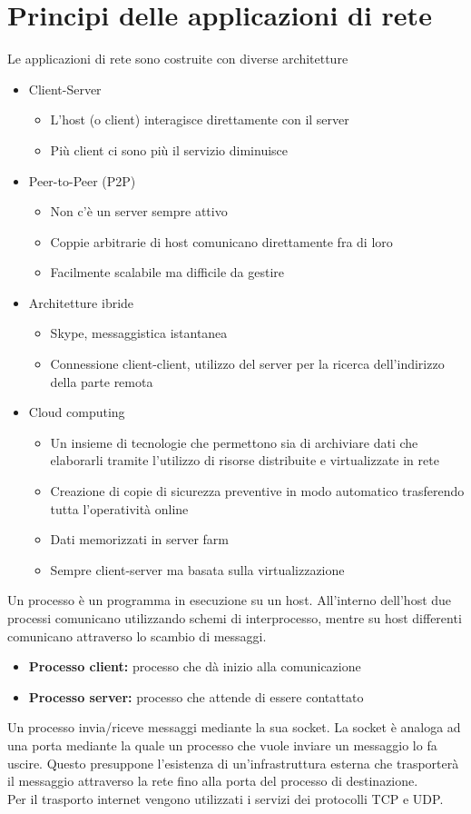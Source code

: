 \documentclass{report}
\begin{document}
	\section{Principi delle applicazioni di rete}
	Le applicazioni di rete sono costruite con diverse architetture
	\begin{itemize}
		\item Client-Server
		\begin{itemize}
			\item L'host (o client) interagisce direttamente con il server
			\item Più client ci sono più il servizio diminuisce
		\end{itemize}
		\item Peer-to-Peer (P2P)
		\begin{itemize}
			\item Non c'è un server sempre attivo
			\item Coppie arbitrarie di host comunicano direttamente fra di loro
			\item Facilmente scalabile ma difficile da gestire
		\end{itemize}
		\item Architetture ibride
		\begin{itemize}
			\item Skype, messaggistica istantanea
			\item Connessione client-client, utilizzo del server per la ricerca dell'indirizzo della parte remota
		\end{itemize}
		\item Cloud computing
		\begin{itemize}
			\item Un insieme di tecnologie che permettono sia di archiviare dati che elaborarli tramite l'utilizzo di risorse distribuite e virtualizzate in rete
			\item Creazione di copie di sicurezza preventive in modo automatico trasferendo tutta l'operatività online
			\item Dati memorizzati in server farm
			\item Sempre client-server ma basata sulla virtualizzazione
		\end{itemize}
	\end{itemize}
	Un processo è un programma in esecuzione su un host. All'interno dell'host due processi comunicano utilizzando schemi di interprocesso, mentre su host differenti comunicano attraverso lo scambio di messaggi.
	\begin{itemize}
		\item \textbf{Processo client:} processo che dà inizio alla comunicazione
		\item \textbf{Processo server:} processo che attende di essere contattato
	\end{itemize}
	Un processo invia/riceve messaggi mediante la sua socket. La socket è analoga ad una porta mediante la quale un processo che vuole inviare un messaggio lo fa uscire. Questo presuppone l’esistenza di un’infrastruttura esterna che trasporterà il messaggio attraverso la rete fino alla porta del processo di destinazione.
	\medskip\\ Per il trasporto internet vengono utilizzati i servizi dei protocolli TCP e UDP.
\end{document}
